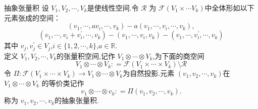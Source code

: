 \documentclass[../../几何与拓扑.tex]{subfiles}
\begin{document}
\begin{definition}{抽象张量积}
    设 $ V_1,V_2,\cdots,V_k  $是使线性空间.令 $ \mathscr{R} $  为 $ \mathscr{F} \left( V_1\times \cdots V_{k} \right) $中全体形如以下元素张成的空间： $$
    \left( v_1,\cdots,av_{i},\cdots,v_{k} \right)-a \left( v_1,\cdots,v_{i},\cdots,v_{k} \right),  
    $$ $$
    \left( v_1,\cdots,v_{i}+ v_{i}^{\prime} ,\cdots,v_{k} \right)- \left( v_1,\cdots,v_{i},v_{k} \right)-\left( v_1,\cdots,v_{i}^{\prime} ,\cdots,v_{k} \right)   
    $$其中 $ v_{j},v_{j}^{\prime} \in  V_{j} $,$ i \in  \{  1,2,\cdots,k \} $,$  a \in \mathbb{R}$.\\ 
     定义 $ V_1,V_2,\cdots,V_k $的张量积空间,记作 $ V_1 \otimes \cdots\otimes  V_{k} $,为下面的商空间 $$
     V_1\otimes  \cdots \otimes  V_{k} : = \mathscr{F}\left( V_1\times \cdots \times  V_{k} \right) \setminus \mathscr{R} 
     $$   令 $ \Pi: \mathscr{F}\left( V_1 \times \cdots \times V_{k} \right) \to V_1\otimes \cdots \otimes V_{k} $为自然投影.元素 $ \left( v_1,v_2,\cdots,v_k    \right)  $在 $ V_1 \otimes  \cdots \otimes  V_{k} $   的等价类记作 $$
     v_1\otimes  \cdots \otimes v_{k}: =\Pi \left( v_1,v_2,\cdots,v_k     \right). 
     $$ 称为 $ v_1,v_2,\cdots,v_k $的抽象张量积.  
\end{definition}
\end{document}
